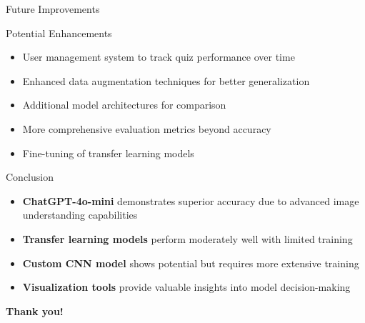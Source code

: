 \documentclass{beamer}
\begin{document}
\begin{frame}{Future Improvements}
    \begin{block}{Potential Enhancements}
        \begin{itemize}
            \item User management system to track quiz performance over time
            \item Enhanced data augmentation techniques for better generalization
            \item Additional model architectures for comparison
            \item More comprehensive evaluation metrics beyond accuracy
            \item Fine-tuning of transfer learning models
        \end{itemize}
    \end{block}
\end{frame}

\begin{frame}{Conclusion}
    \begin{itemize}
        \item \textbf{ChatGPT-4o-mini} demonstrates superior accuracy due to advanced image understanding capabilities
        \item \textbf{Transfer learning models} perform moderately well with limited training
        \item \textbf{Custom CNN model} shows potential but requires more extensive training
        \item \textbf{Visualization tools} provide valuable insights into model decision-making
    \end{itemize}
    
    \vspace{0.5cm}
    \begin{center}
        \textbf{\textcolor{maincolor}{Thank you!}}
    \end{center}
\end{frame}
\end{document}
